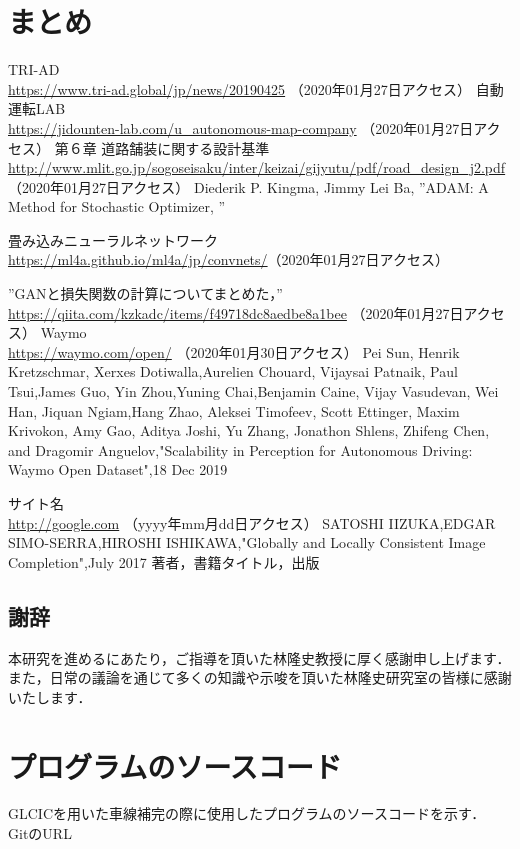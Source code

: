 \documentclass[a4j, 11pt]{jreport}
\begin{document}
\chapter{まとめ}

\newpage
\begin{thebibliography}{1}
	TRI-AD\\ \url{https://www.tri-ad.global/jp/news/20190425} （2020年01月27日アクセス） 
	自動運転LAB\\ \url{https://jidounten-lab.com/u_autonomous-map-company} （2020年01月27日アクセス）
	第６章 道路舗装に関する設計基準\\ \url{http://www.mlit.go.jp/sogoseisaku/inter/keizai/gijyutu/pdf/road_design_j2.pdf} （2020年01月27日アクセス）
	Diederik P. Kingma, Jimmy Lei Ba, ”ADAM: A Method for Stochastic Optimizer, ”

	畳み込みニューラルネットワーク\\ \url{https://ml4a.github.io/ml4a/jp/convnets/}（2020年01月27日アクセス）

	”GANと損失関数の計算についてまとめた，” \\
	\url{https://qiita.com/kzkadc/items/f49718dc8aedbe8a1bee} （2020年01月27日アクセス）
	Waymo\\ \url{https://waymo.com/open/} （2020年01月30日アクセス）
	Pei Sun, Henrik Kretzschmar, Xerxes Dotiwalla,Aurelien Chouard, Vijaysai Patnaik, Paul Tsui,James Guo, Yin Zhou,Yuning Chai,Benjamin Caine, Vijay Vasudevan, Wei Han, Jiquan Ngiam,Hang Zhao, Aleksei Timofeev, Scott Ettinger, Maxim Krivokon, Amy Gao, Aditya Joshi, Yu	Zhang, Jonathon Shlens, Zhifeng Chen, and Dragomir Anguelov,"Scalability in Perception for Autonomous Driving: Waymo Open Dataset",18 Dec 2019
	
	サイト名\\ \url{http://google.com} （yyyy年mm月dd日アクセス） %
	SATOSHI IIZUKA,EDGAR SIMO-SERRA,HIROSHI ISHIKAWA,"Globally and Locally Consistent Image Completion",July 2017
著者，書籍タイトル，出版                                      %
\end{thebibliography}
\newpage





\newpage
\section*{謝辞}
本研究を進めるにあたり，ご指導を頂いた林隆史教授に厚く感謝申し上げます．
また，日常の議論を通じて多くの知識や示唆を頂いた林隆史研究室の皆様に感謝いたします．

\appendix
\chapter{プログラムのソースコード}
GLCICを用いた車線補完の際に使用したプログラムのソースコードを示す．\\
GitのURL
\end{document}
